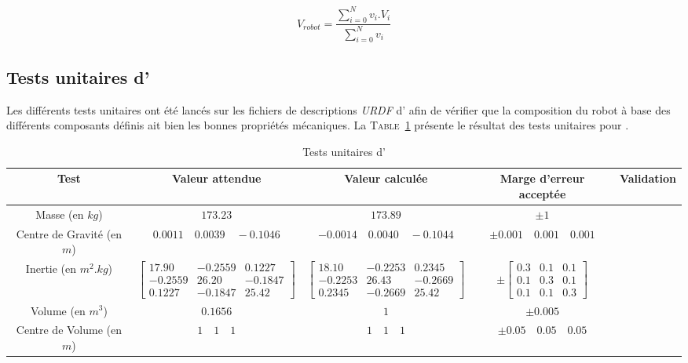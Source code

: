 				$$V_{robot} = \frac{\sum_{i=0}^{N}v_i.V_i}{\sum_{i=0}^{N}v_i}$$


		\subsection{Tests unitaires d'\argos{}}

			Les différents tests unitaires ont été lancés sur les fichiers de descriptions \textit{URDF} d'\argos{} afin de vérifier que la composition du robot à base des différents composants définis ait bien les bonnes propriétés mécaniques. La \textsc{Table}~\ref{table:argos_unittest} présente le résultat des tests unitaires pour \argos{}.
			
			\begin{table}[!htb]
				\centering
				\begin{adjustbox}{max width=\textwidth}
					\begin{tabular}{|c|c|c|c|c|}
						\hline
						\textbf{Test} & \textbf{Valeur attendue} & \textbf{Valeur calculée} & \textbf{Marge d'erreur acceptée} & \textbf{Validation} \\
						\hline
						Masse (en $kg$) & $173.23$ & $173.89$ & $\pm 1$ & \cmark \\
						\hline
						Centre de Gravité (en $m$) & $0.0011 \quad 0.0039 \quad -0.1046$ & $-0.0014 \quad 0.0040 \quad -0.1044$ & $\pm 0.001 \quad 0.001 \quad 0.001$ & \cmark \\
						\hline
						Inertie (en $m^2.kg$) & $\begin{bmatrix}17.90 & -0.2559 & 0.1227 \\ -0.2559 & 26.20 & -0.1847 \\ 0.1227 & -0.1847 & 25.42\end{bmatrix}$ & $\begin{bmatrix}18.10 & -0.2253 & 0.2345 \\ -0.2253 & 26.43 & -0.2669 \\ 0.2345 & -0.2669 & 25.42\end{bmatrix}$ & $\pm \begin{bmatrix}0.3 & 0.1 & 0.1 \\ 0.1 & 0.3 & 0.1 \\ 0.1 & 0.1 & 0.3\end{bmatrix}$ & \cmark \\
						\hline
						Volume (en $m^3$) & $0.1656$ & $1$ & $\pm 0.005$ & \cmark \\
						\hline
						Centre de Volume (en $m$) & $1 \quad 1 \quad 1$ & $1 \quad 1 \quad 1$ & $\pm 0.05 \quad 0.05 \quad 0.05$ & \cmark \\
						\hline
					\end{tabular}
				\end{adjustbox}
				\caption{Tests unitaires d'\argos{}}
				\label{table:argos_unittest}
			\end{table}

